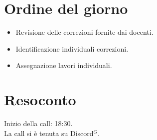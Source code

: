 \section{Ordine del giorno}

\begin{itemize}
	\item Revisione delle correzioni fornite dai docenti.
	\item Identificazione individuali correzioni.
	\item Assegnazione lavori individuali.
\end{itemize}

\section{Resoconto}
\label{sec:Resoconto}

\noindent 
Inizio della call: 18:30. \\
\noindent La call si è tenuta su Discord$^{G}$.

